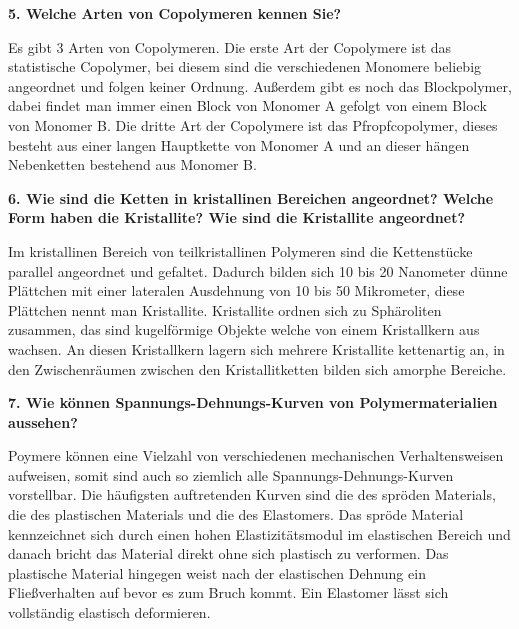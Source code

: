 \noindent\textbf{5. Welche Arten von Copolymeren kennen Sie?}\\
\begin{addmargin}[25pt]{0pt}
Es gibt 3 Arten von Copolymeren. Die erste Art der Copolymere ist das statistische Copolymer, bei diesem sind die verschiedenen Monomere beliebig angeordnet und folgen keiner Ordnung. Außerdem gibt es noch das Blockpolymer, dabei findet man immer einen Block von Monomer A  gefolgt von einem Block von Monomer B. Die dritte Art der Copolymere ist das Pfropfcopolymer, dieses besteht aus einer langen Hauptkette von Monomer A und an dieser hängen Nebenketten bestehend aus Monomer B.\\
\end{addmargin}

\noindent\textbf{6. Wie sind die Ketten in kristallinen Bereichen angeordnet? Welche Form haben die Kristallite? Wie sind die Kristallite angeordnet?}\\
\begin{addmargin}[25pt]{0pt}
Im kristallinen Bereich von teilkristallinen Polymeren sind die Kettenstücke parallel angeordnet und gefaltet. Dadurch bilden sich 10 bis 20 Nanometer dünne Plättchen mit einer lateralen Ausdehnung von 10 bis 50 Mikrometer, diese Plättchen nennt man Kristallite. Kristallite ordnen sich zu Sphäroliten zusammen, das sind kugelförmige Objekte welche von einem Kristallkern aus wachsen. An diesen Kristallkern lagern sich mehrere Kristallite kettenartig an, in den Zwischenräumen zwischen den Kristallitketten bilden sich amorphe Bereiche. \\
\end{addmargin}

\noindent\textbf{7. Wie können Spannungs-Dehnungs-Kurven von Polymermaterialien aussehen?}\\
\begin{addmargin}[25pt]{0pt}
Poymere können eine Vielzahl von verschiedenen mechanischen Verhaltensweisen aufweisen, somit sind auch so ziemlich alle Spannungs-Dehnungs-Kurven vorstellbar. Die häufigsten auftretenden Kurven sind die des spröden Materials, die des plastischen Materials und die des Elastomers. Das spröde Material kennzeichnet sich durch einen hohen Elastizitätsmodul im elastischen Bereich und danach bricht das Material direkt ohne sich plastisch zu verformen. Das plastische Material hingegen weist nach der elastischen Dehnung ein Fließverhalten auf bevor es zum Bruch kommt. Ein Elastomer lässt sich vollständig elastisch deformieren.\\
\end{addmargin}

